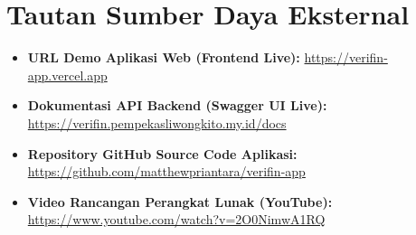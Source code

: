 \documentclass[12pt,a4paper]{article}
\begin{document}
\section{Tautan Sumber Daya Eksternal}
\begin{itemize}
    \item \textbf{URL Demo Aplikasi Web (Frontend Live):} \url{https://verifin-app.vercel.app}
    \item \textbf{Dokumentasi API Backend (Swagger UI Live):} \url{https://verifin.pempekasliwongkito.my.id/docs}
    \item \textbf{Repository GitHub Source Code Aplikasi:} \url{https://github.com/matthewpriantara/verifin-app}
    \item \textbf{Video Rancangan Perangkat Lunak (YouTube):} \url{https://www.youtube.com/watch?v=2O0NimwA1RQ}
\end{itemize}
\end{document}
